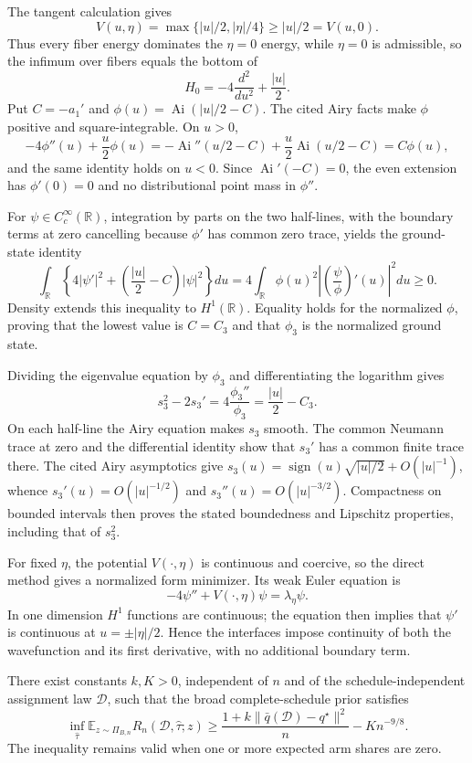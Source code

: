 The tangent calculation gives
\[
V(u,\eta)=\max\{|u|/2,|\eta|/4\}\geq |u|/2=V(u,0).
\]
Thus every fiber energy dominates the \(\eta=0\) energy, while \(\eta=0\) is admissible, so the infimum over fibers equals the bottom of
\[
H_0=-4\frac{d^2}{du^2}+\frac{|u|}{2}.
\]
Put \(C=-a_1'\) and \(\phi(u)=\operatorname{Ai}(|u|/2-C)\).  The cited Airy facts make \(\phi\) positive and square-integrable.  On \(u>0\),
\[
-4\phi''(u)+\frac u2\phi(u)
=-\operatorname{Ai}''(u/2-C)+\frac u2\operatorname{Ai}(u/2-C)
=C\phi(u),
\]
and the same identity holds on \(u<0\).  Since \(\operatorname{Ai}'(-C)=0\), the even extension has \(\phi'(0)=0\) and no distributional point mass in \(\phi''\).

For \(\psi\in C_c^\infty(\mathbb R)\), integration by parts on the two half-lines, with the boundary terms at zero cancelling because \(\phi'\) has common zero trace, yields the ground-state identity
\[
\int_{\mathbb R}\left\{4|\psi'|^2+
\left(\frac{|u|}{2}-C\right)|\psi|^2\right\}du
=4\int_{\mathbb R}\phi(u)^2
\left|\left(\frac{\psi}{\phi}\right)'(u)\right|^2du\geq0.
\]
Density extends this inequality to \(H^1(\mathbb R)\).  Equality holds for the normalized \(\phi\), proving that the lowest value is \(C=C_3\) and that \(\phi_3\) is the normalized ground state.

Dividing the eigenvalue equation by \(\phi_3\) and differentiating the logarithm gives
\[
s_3^2-2s_3'=4\frac{\phi_3''}{\phi_3}
=\frac{|u|}{2}-C_3.
\]
On each half-line the Airy equation makes \(s_3\) smooth.  The common Neumann trace at zero and the differential identity show that \(s_3'\) has a common finite trace there.  The cited Airy asymptotics give \(s_3(u)=\operatorname{sign}(u)\sqrt{|u|/2}+O(|u|^{-1})\), whence \(s_3'(u)=O(|u|^{-1/2})\) and \(s_3''(u)=O(|u|^{-3/2})\).  Compactness on bounded intervals then proves the stated boundedness and Lipschitz properties, including that of \(s_3^2\).

For fixed \(\eta\), the potential \(V(\cdot,\eta)\) is continuous and coercive, so the direct method gives a normalized form minimizer.  Its weak Euler equation is
\[
-4\psi''+V(\cdot,\eta)\psi=\lambda_\eta\psi.
\]
In one dimension \(H^1\) functions are continuous; the equation then implies that \(\psi'\) is continuous at \(u=\pm|\eta|/2\).  Hence the interfaces impose continuity of both the wavefunction and its first derivative, with no additional boundary term.

There exist constants \(k,K>0\), independent of \(n\) and of the schedule-independent assignment law \(\mathcal D\), such that the broad complete-schedule prior satisfies
\[
\inf_{\widehat\tau}
\mathbb E_{z\sim\Pi_{B,n}}R_n(\mathcal D,\widehat\tau;z)
\geq \frac{1+k\|\bar q(\mathcal D)-q^\star\|^2}{n}
-K n^{-9/8}.
\]
The inequality remains valid when one or more expected arm shares are zero.

